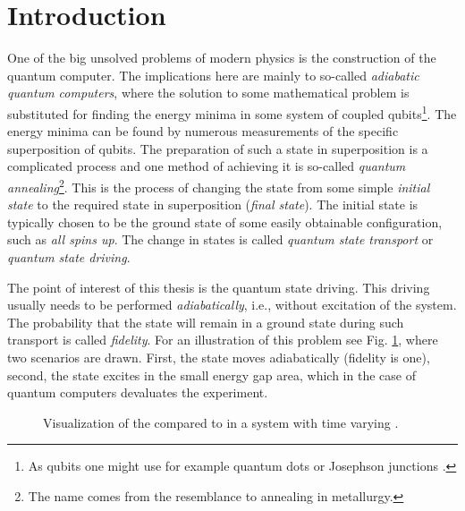 \chapter*{Introduction}
One of the big unsolved problems of modern physics is the construction of the quantum computer. The implications here are mainly to so-called \emph{adiabatic quantum computers}, where the solution to some mathematical problem is substituted for finding the energy minima in some system of coupled qubits\footnote{As qubits one might use for example quantum dots \citep{dots} or Josephson junctions \citep{josephson}.}. The energy minima can be found by numerous measurements of the specific superposition of qubits. The preparation of such a state in superposition is a complicated process and one method of achieving it is so-called \emph{quantum annealing}\footnote{The name comes from the resemblance to annealing in metallurgy.}. This is the process of changing the state from some simple \emph{initial state} to the required state in superposition (\emph{final state}). The initial state is typically chosen to be the ground state of some easily obtainable configuration, such as \emph{all spins up}. The change in states is called \emph{quantum state transport} or \emph{quantum state driving}.

The point of interest of this thesis is the quantum state driving. This driving usually needs to be performed \emph{adiabatically}, i.e., without excitation of the system. The probability that the state will remain in a ground state during such transport is called \emph{fidelity}. For an illustration of this problem see Fig. \ref{fig:introDriving}, where two scenarios are drawn. First, the state moves adiabatically (fidelity is one), second, the state excites in the small energy gap area, which in the case of quantum computers devaluates the experiment.

\begin{figure}[H]
    \centering
\caption{Visualization of the  compared to  in a system with time varying .}
    \label{fig:introDriving}
\end{figure}


